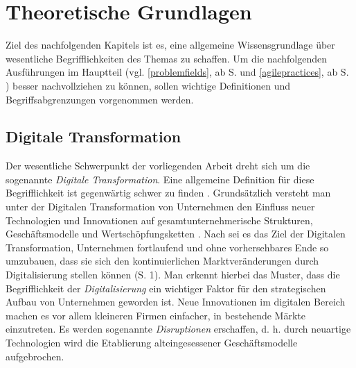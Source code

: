 \chapter{Theoretische Grundlagen}
\label{background}


Ziel des nachfolgenden Kapitels ist es, eine allgemeine Wissensgrundlage über wesentliche Begrifflichkeiten des Themas zu schaffen. Um die nachfolgenden Ausführungen im Hauptteil (vgl. \ref{problemfields}, ab S. \pageref{problemfields} und \ref{agilepractices}, ab S. \pageref{agilepractices}) besser nachvollziehen zu können, sollen wichtige Definitionen und Begriffsabgrenzungen vorgenommen werden.

\section{Digitale Transformation}
\label{background:dt}

Der wesentliche Schwerpunkt der vorliegenden Arbeit dreht sich um die sogenannte \textit{Digitale Transformation}. Eine allgemeine Definition für diese Begrifflichkeit ist gegenwärtig schwer zu finden \cite[S. 3]{schallmo_digitale_2017}. Grundsätzlich versteht man unter der Digitalen Transformation von Unternehmen den Einfluss neuer Technologien und Innovationen auf gesamtunternehmerische Strukturen, Geschäftsmodelle und Wertschöpfungsketten \cite{oswald_digitale_2018}. Nach  sei es das Ziel der Digitalen Transformation, Unternehmen fortlaufend und ohne vorhersehbares Ende so umzubauen, dass sie sich den kontinuierlichen Marktveränderungen durch Digitalisierung stellen können (S. 1). Man erkennt hierbei das Muster, dass die Begrifflichkeit der \textit{Digitalisierung} ein wichtiger Faktor für den strategischen Aufbau von Unternehmen geworden ist. Neue Innovationen im digitalen Bereich machen es vor allem kleineren Firmen einfacher, in bestehende Märkte einzutreten. Es werden sogenannte \textit{Disruptionen} erschaffen, d. h. durch neuartige Technologien wird die Etablierung alteingesessener Geschäftsmodelle aufgebrochen. 
 
